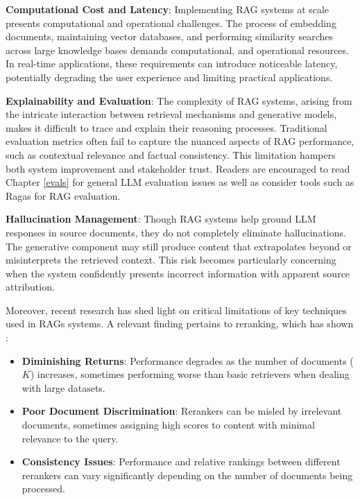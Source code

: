 \textbf{Computational Cost and Latency}: Implementing RAG systems at scale presents computational and operational challenges. The process of embedding documents, maintaining vector databases, and performing similarity searches across large knowledge bases demands computational, and operational resources. In real-time applications, these requirements can introduce noticeable latency, potentially degrading the user experience and limiting practical applications.
 
\textbf{Explainability and Evaluation}: The complexity of RAG systems, arising from the intricate interaction between retrieval mechanisms and generative models, makes it difficult to trace and explain their reasoning processes. Traditional evaluation metrics often fail to capture the nuanced aspects of RAG performance, such as contextual relevance and factual consistency. This limitation hampers both system improvement and stakeholder trust. Readers are encouraged to read Chapter \ref{evals} for general LLM evaluation issues as well as consider tools such as Ragas  for RAG evaluation.
 
\textbf{Hallucination Management}: Though RAG systems help ground LLM responses in source documents, they do not completely eliminate hallucinations. The generative component may still produce content that extrapolates beyond or misinterprets the retrieved context. This risk becomes particularly concerning when the system confidently presents incorrect information with apparent source attribution.

Moreover, recent research has shed light on critical limitations of key techniques used in RAGs systems. A relevant finding pertains to reranking, which has shown :

\begin{itemize}
\item \textbf{Diminishing Returns}: Performance degrades as the number of documents ($K$) increases, sometimes performing worse than basic retrievers when dealing with large datasets.
\item \textbf{Poor Document Discrimination}: Rerankers can be misled by irrelevant documents, sometimes assigning high scores to content with minimal relevance to the query.
\item \textbf{Consistency Issues}: Performance and relative rankings between different rerankers can vary significantly depending on the number of documents being processed.
\end{itemize}
